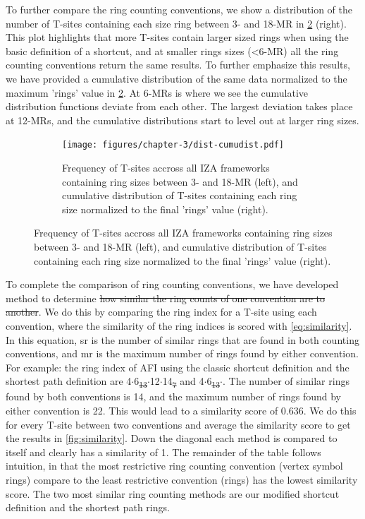 \documentclass[preprint,numrefs,noinfo,sort&compress]{elsarticle}
\providecommand{\DIFadd}[1]{{\protect\color{blue}\uwave{#1}}} %
\providecommand{\DIFdel}[1]{{\protect\color{red}\sout{#1}}}                      %
\providecommand{\DIFaddbegin}{} %
\providecommand{\DIFaddend}{} %
\providecommand{\DIFdelbegin}{} %
\providecommand{\DIFdelend}{} %
\newcommand{\DIFscaledelfig}{0.5}
\newlength{\DIFdelgraphicswidth} %
\newlength{\DIFdelgraphicsheight} %
\newcommand{\DIFaddincludegraphics}[2][]{{\color{blue}\fbox{\DIFOincludegraphics[#1]{#2}}}} %
\newcommand{\DIFdelincludegraphics}[2][]{%
\sbox{\DIFdelgraphicsbox}{\DIFOincludegraphics[#1]{#2}}%
\settoboxwidth{\DIFdelgraphicswidth}{\DIFdelgraphicsbox} %
\settoboxtotalheight{\DIFdelgraphicsheight}{\DIFdelgraphicsbox} %
\scalebox{\DIFscaledelfig}{%
\parbox[b]{\DIFdelgraphicswidth}{\usebox{\DIFdelgraphicsbox}\\[-\baselineskip] \rule{\DIFdelgraphicswidth}{0em}}\llap{\resizebox{\DIFdelgraphicswidth}{\DIFdelgraphicsheight}{%
\setlength{\unitlength}{\DIFdelgraphicswidth}%
\begin{picture}(1,1)%
\thicklines\linethickness{2pt} %
{\color[rgb]{1,0,0}\put(0,0){\framebox(1,1){}}}%
{\color[rgb]{1,0,0}\put(0,0){\line( 1,1){1}}}%
{\color[rgb]{1,0,0}\put(0,1){\line(1,-1){1}}}%
\end{picture}%
}\hspace*{3pt}}} %
} %
\DeclareRobustCommand{\DIFaddbegin}{\DIFOaddbegin \let\includegraphics\DIFaddincludegraphics} %
\DeclareRobustCommand{\DIFaddend}{\DIFOaddend \let\includegraphics\DIFOincludegraphics} %
\DeclareRobustCommand{\DIFdelbegin}{\DIFOdelbegin \let\includegraphics\DIFdelincludegraphics} %
\DeclareRobustCommand{\DIFdelend}{\DIFOaddend \let\includegraphics\DIFOincludegraphics} %
\begin{document}
To further compare the ring counting conventions, we show a distribution of the number of T-sites containing each size ring between 3- and 18-MR in \cref{fig:tsite-frequency} (right). This plot highlights that more T-sites contain larger sized rings when using the basic definition of a shortcut, and at smaller rings sizes (\textless6-MR) all the ring counting conventions return the same results.  To further emphasize this results, we have provided a cumulative distribution of the same data normalized to the maximum 'rings' value in \cref{fig:tsite-frequency}. At 6-MRs is where we see the cumulative distribution functions deviate from each other. The largest deviation takes place at 12-MRs, and the cumulative distributions start to level out at larger ring sizes. 

\begin{figure}
\begin{figure}[H]
\centering
\texttt{[image: figures/chapter-3/dist-cumudist.pdf]}
\caption{Frequency of T-sites accross all IZA frameworks containing ring sizes between 3- and 18-MR (left), and cumulative distribution of T-sites containing each ring size normalized to the final 'rings' value (right). \label{fig:tsite-frequency}}
\end{figure}
\end{figure}

To complete the comparison of ring counting conventions, we have developed \DIFaddbegin \DIFadd{a }\DIFaddend method to determine \DIFdelbegin \DIFdel{how similar the ring counts of one convention are to another}\DIFdelend \DIFaddbegin \DIFadd{the similarity between ring count  conventions}\DIFaddend . We do this by comparing the ring index for a T-site using each convention, where the similarity of the ring indices is scored with \cref{eq:similarity}. In this equation, sr is the number of similar rings that are found in both counting conventions, and mr is the maximum number of rings found by either convention. For example: the ring index of AFI using the classic shortcut definition and the shortest path definition are 4\(\cdot\)6\DIFdelbegin \DIFdel{\textsubscript{13}\(\cdot\)}\DIFdelend \DIFaddbegin \DIFadd{\(_{\text{13}} \cdot\)}\DIFaddend 12\(\cdot\)14\DIFdelbegin \DIFdel{\textsubscript{7} }\DIFdelend \DIFaddbegin \DIFadd{\(_{\text{7}}\) }\DIFaddend and 4\(\cdot\)6\DIFdelbegin \DIFdel{\textsubscript{13}\(\cdot\)}\DIFdelend \DIFaddbegin \DIFadd{\(_{\text{13}} \cdot\)}\DIFaddend . The number of similar rings found by both conventions is 14, and the maximum number of rings found by either convention is 22. This would lead to a similarity score of 0.636. We do this for every T-site between two conventions and average the similarity score to get the results in \cref{fig:similarity}. Down the diagonal each method is compared to itself and clearly has a similarity of 1. The remainder of the table follows intuition, in that the  most restrictive ring counting convention (vertex symbol rings) compare to the least restrictive convention (rings) has the lowest similarity score. The two most similar ring counting methods are our modified shortcut definition and the shortest path rings. 
\end{document}
